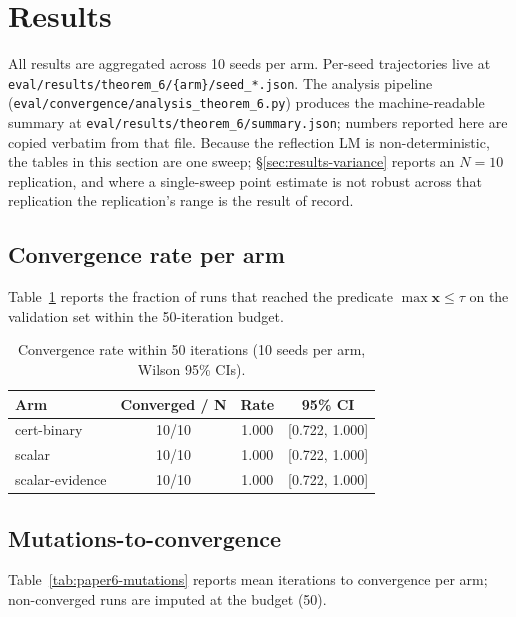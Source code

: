 \section{Results}\label{sec:results}

All results are aggregated across 10 seeds per arm.  Per-seed
trajectories live at \texttt{eval/results/theorem\_6/\{arm\}/seed\_*.json}.
The analysis pipeline
(\texttt{eval/convergence/analysis\_theorem\_6.py}) produces the
machine-readable summary at \texttt{eval/results/theorem\_6/summary.json};
numbers reported here are copied verbatim from that file.  Because
the reflection LM is non-deterministic, the tables in this section
are one sweep; §\ref{sec:results-variance} reports an $N=10$
replication, and where a single-sweep point estimate is not robust
across that replication the replication's range is the result of
record.

\subsection{Convergence rate per arm}

Table~\ref{tab:paper6-convergence-rate} reports the fraction of
runs that reached the predicate $\max \mathbf{x} \le \tau$ on the
validation set within the 50-iteration budget.

\begin{table}[h]
\caption{Convergence rate within 50 iterations (10 seeds per arm,
Wilson 95\% CIs).}
\label{tab:paper6-convergence-rate}
\centering
\small
\begin{tabular}{lccc}
\toprule
Arm & Converged / N & Rate & 95\% CI \\
\midrule
cert-binary       & 10/10 & 1.000 & [0.722, 1.000] \\
scalar            & 10/10 & 1.000 & [0.722, 1.000] \\
scalar-evidence   & 10/10 & 1.000 & [0.722, 1.000] \\
\bottomrule
\end{tabular}
\end{table}

\subsection{Mutations-to-convergence}

Table~\ref{tab:paper6-mutations} reports mean iterations to
convergence per arm; non-converged runs are imputed at the
budget (50).

